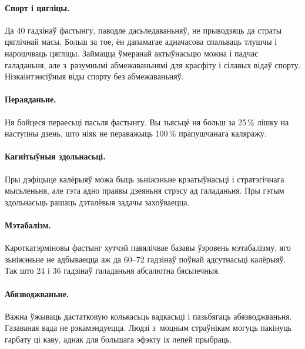 \paragraph{Спорт і цягліцы.}
Да 40 гадзінаў фастынгу, паводле дасьледаваньняў, не прыводзяць да страты цяглічнай масы. Больш за тое, ён дапамагае адначасова спальваць тлушчы і нарошчваць цягліцы. Займацца ўмеранай актыўнасьцю можна і падчас галаданьня, але з~разумнымі абмежаваньнямі для красфіту і сілавых відаў спорту. Нізкаінтэнсіўныя віды спорту без абмежаваньняў.

\paragraph{Пераяданьне.}
Ня бойцеся пераесьці пасьля фастынгу. Вы зьясьцё ня больш за 25\,\% лішку на наступны дзень, што ніяк не пераважыць 100\,\% прапушчанага каляражу.

\paragraph{Кагнітыўныя здольнасьці.}
Пры дэфіцыце калёрыяў можа быць зьніжэньне крэатыўнасьці і стратэгічнага мысьленьня, але гэта адно праявы дзеяньня стрэсу ад галаданьня. Пры гэтым здольнасьць рашаць дэталёвыя задачы захоўваецца.

\paragraph{Мэтабалізм.}
Кароткатэрміновы фастынг хутчэй павялічвае базавы ўзровень мэтабалізму, яго зьніжэньне не адбываецца аж да 60--72 гадзінаў поўнай адсутнасьці калёрыяў. Так што 24 і 36 гадзінаў галаданьня абсалютна бясьпечныя.

\paragraph{Абязводжваньне.}
Важна ўжываць дастатковую колькасьць вадкасьці і пазьбягаць абязводжваньня. Газаваная вада не рэкамэндуецца. Людзі з~моцным страўнікам могуць пакінуць гарбату ці каву, аднак для большага эфэкту іх лепей прыбраць.


